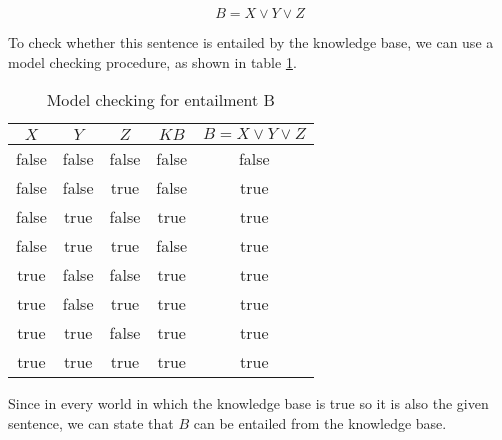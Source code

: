 \documentclass[letterpaper,headings=standardclasses]{scrartcl}
\begin{document}
$$ B = X \vee Y \vee Z $$

To check whether this sentence is entailed by the knowledge base, we can use a model checking procedure, as shown in table \ref{tt_b}.

\begin{table}[h]
    \centering
    \begin{tabular}{|c|c|c|c|c|}
    \hline
    $X$ & $Y$ & $Z$ & $KB$ & $B = X \vee Y \vee Z$ \\ \hline
    false & false & false & false & false \\ \hline
    false & false & true & false & true \\ \hline
    false & true & false & true & true \\ \hline
    false & true & true & false & true \\ \hline
    true & false & false & true & true \\ \hline
    true & false & true & true & true \\ \hline
    true & true & false & true & true \\ \hline
    true & true & true & true & true \\ \hline
    \end{tabular}
    \caption{Model checking for entailment B}
    \label{tt_b}
\end{table}

Since in every world in which the knowledge base is true so it is also the given sentence, we can state that $B$ can be entailed from the knowledge base.
\end{document}
